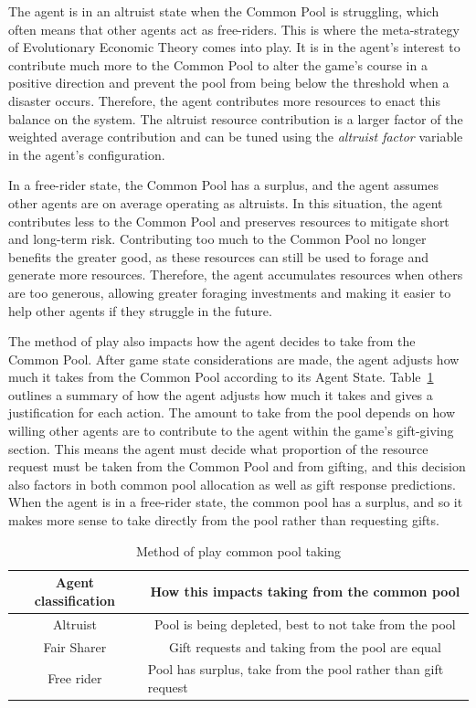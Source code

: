 The agent is in an altruist state when the Common Pool is struggling, which often means that other agents act as free-riders. This is where the meta-strategy of Evolutionary Economic Theory comes into play. It is in the agent's interest to contribute much more to the Common Pool to alter the game's course in a positive direction and prevent the pool from being below the threshold when a disaster occurs. Therefore, the agent contributes more resources to enact this balance on the system. 
The altruist resource contribution is a larger factor of the weighted average contribution and can be tuned using the \emph{altruist factor} variable in the agent's configuration.

In a free-rider state, the Common Pool has a surplus, and the agent assumes other agents are on average operating as altruists. In this situation, the agent contributes less to the Common Pool and preserves resources to mitigate short and long-term risk. Contributing too much to the Common Pool no longer benefits the greater good, as these resources can still be used to forage and generate more resources. Therefore, the agent accumulates resources when others are too generous, allowing greater foraging investments and making it easier to help other agents if they struggle in the future.

The method of play also impacts how the agent decides to take from the Common Pool. After game state considerations are made, the agent adjusts how much it takes from the Common Pool according to its Agent State. Table~\ref{tab:Method of play common pool taking} outlines a summary of how the agent adjusts how much it takes and gives a justification for each action. The amount to take from the pool depends on how willing other agents are to contribute to the agent within the game's gift-giving section.  This means the agent must decide what proportion of the resource request must be taken from the Common Pool and from gifting, and this decision also factors in both common pool allocation as well as gift response predictions. When the agent is in a free-rider state, the common pool has a surplus, and so it makes more sense to take directly from the pool rather than requesting gifts. 

\begin{table}[!htb]
\centering
\caption{Method of play common pool taking}
\label{tab:Method of play common pool taking}
\begin{tabular}{|c|c|}
\hline
\textbf{Agent classification} & \textbf{How this impacts taking from the common pool}                              \\ \hline
Altruist                      & Pool is being depleted, best to not take from the pool                             \\ \hline
Fair Sharer                   & Gift requests and taking from the pool are equal                                   \\ \hline
Free rider                    & \multicolumn{1}{l|}{Pool has surplus, take from the pool rather than gift request} \\ \hline
\end{tabular}
\end{table}

